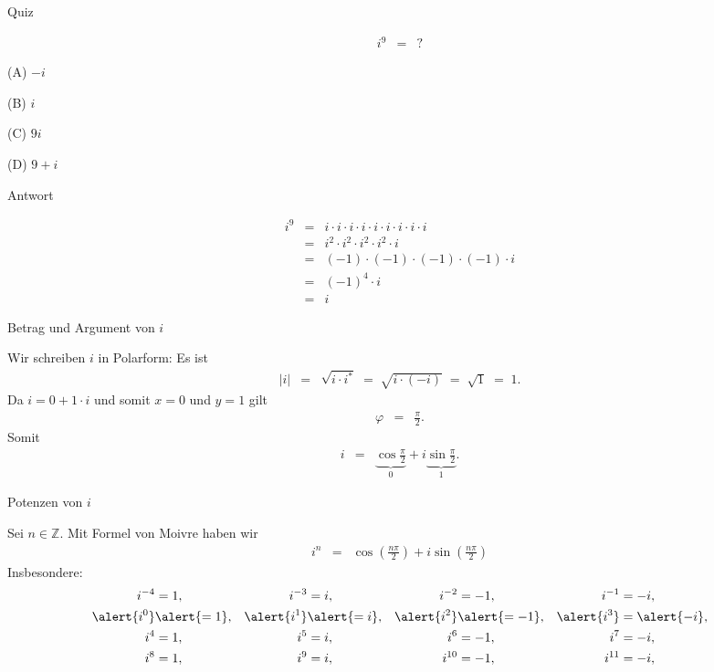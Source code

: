 \documentclass[german]{beamer}
\newcommand{\bq}{\begin{eqnarray*}}
\newcommand{\eq}{\end{eqnarray*}}
\begin{document}
\begin{frame}{Quiz}

\bq
 i^9 & = & ?
\eq 
\begin{description}
\item{(A)} $-i$
\item{(B)} $i$
\item{(C)} $9 i$
\item{(D)} $9+i$
\end{description}

\end{frame}

\begin{frame}{Antwort}

\bq
 i^9 & = & 
 i \cdot i \cdot i \cdot i \cdot i \cdot i \cdot i \cdot i \cdot i 
 \nonumber \\
 & = &
 i^2 \cdot i^2 \cdot i^2 \cdot i^2 \cdot i
 \nonumber \\
 & = &  
 \left(-1\right) \cdot \left(-1\right) \cdot \left(-1\right) \cdot \left(-1\right) \cdot i
 \nonumber \\
 & = &
 \left(-1\right)^4 \cdot i
 \nonumber \\
 & = & 
 i 
\eq 

\end{frame}

\begin{frame}{Betrag und Argument von $i$}

Wir schreiben $i$ in Polarform: Es ist
\bq
 \left| i \right| 
 & = & 
 \sqrt{ i \cdot i^\ast}
 \; = \; \sqrt{ i \cdot \left(-i\right)}
 \; = \; \sqrt{1}
 \; = \; 1.
\eq
Da $i = 0 + 1 \cdot i$ und somit $x=0$ und $y=1$ gilt
\bq
 \varphi & = & \frac{\pi}{2}.
\eq
Somit
\bq
 i & = & \underbrace{\cos \frac{\pi}{2}}_{0} + i \underbrace{\sin \frac{\pi}{2}}_{1}.
\eq


\end{frame}

\begin{frame}{Potenzen von $i$}

Sei $n \in {\mathbb Z}$. Mit Formel von Moivre haben wir
\bq
 i^n
 & = &
 \cos\left( \frac{n \pi}{2} \right) + i \sin\left( \frac{n \pi}{2}\right)
\eq
Insbesondere:
\begin{align*}
 i^{-4} & = 1,
 &
 i^{-3} & = i,
 &
 i^{-2} & = -1,
 &
 i^{-1} & = -i,
 \nonumber \\
 \alert{i^0} & \alert{= 1},
 &
 \alert{i^1} & \alert{= i},
 &
 \alert{i^2} & \alert{= -1},
 &
 \alert{i^3} & = \alert{-i},
 \nonumber \\
 i^4 & = 1,
 &
 i^5 & = i,
 &
 i^6 & = -1,
 &
 i^7 & = -i,
 \nonumber \\
 i^8 & = 1,
 &
 i^9 & = i,
 &
 i^{10} & = -1,
 &
 i^{11} & = -i,
\end{align*}

\end{frame}
\end{document}
